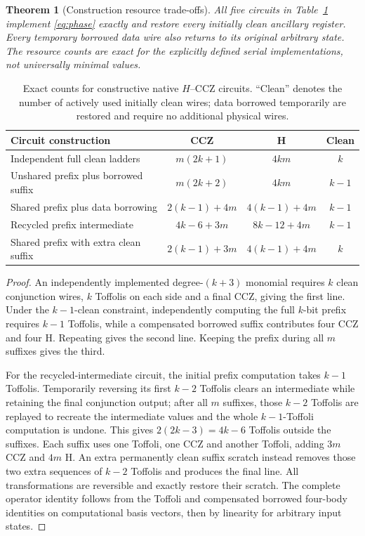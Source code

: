 \documentclass[11pt,a4paper]{article}
\newtheorem{theorem}{Theorem}
\begin{document}
\begin{theorem}[Construction resource trade-offs]\label{thm:bounds}
All five circuits in Table~\ref{tab:formulas} implement \eqref{eq:phase} exactly and restore every initially clean ancillary register. Every temporary borrowed data wire also returns to its original arbitrary state. The resource counts are exact for the explicitly defined serial implementations, not universally minimal values.
\end{theorem}
\begin{table}[ht]
\centering\small
\caption{Exact counts for constructive native $H$--CCZ circuits. ``Clean'' denotes the number of actively used initially clean wires; data borrowed temporarily are restored and require no additional physical wires.}
\label{tab:formulas}
\begin{tabular}{@{}lccc@{}}\toprule
Circuit construction & CCZ & H & Clean\\\midrule
Independent full clean ladders & $m(2k+1)$ & $4km$ & $k$\\
Unshared prefix plus borrowed suffix & $m(2k+2)$ & $4km$ & $k-1$\\
Shared prefix plus data borrowing & $2(k-1)+4m$ & $4(k-1)+4m$ & $k-1$\\
Recycled prefix intermediate & $4k-6+3m$ & $8k-12+4m$ & $k-1$\\
Shared prefix with extra clean suffix & $2(k-1)+3m$ & $4(k-1)+4m$ & $k$\\\bottomrule
\end{tabular}
\end{table}
\begin{proof}
An independently implemented degree-$(k+3)$ monomial requires $k$ clean conjunction wires, $k$ Toffolis on each side and a final CCZ, giving the first line. Under the $k-1$-clean constraint, independently computing the full $k$-bit prefix requires $k-1$ Toffolis, while a compensated borrowed suffix contributes four CCZ and four H. Repeating gives the second line. Keeping the prefix during all $m$ suffixes gives the third.

For the recycled-intermediate circuit, the initial prefix computation takes $k-1$ Toffolis. Temporarily reversing its first $k-2$ Toffolis clears an intermediate while retaining the final conjunction output; after all $m$ suffixes, those $k-2$ Toffolis are replayed to recreate the intermediate values and the whole $k-1$-Toffoli computation is undone. This gives $2(2k-3)=4k-6$ Toffolis outside the suffixes. Each suffix uses one Toffoli, one CCZ and another Toffoli, adding $3m$ CCZ and $4m$ H. An extra permanently clean suffix scratch instead removes those two extra sequences of $k-2$ Toffolis and produces the final line. All transformations are reversible and exactly restore their scratch. The complete operator identity follows from the Toffoli and compensated borrowed four-body identities on computational basis vectors, then by linearity for arbitrary input states.
\end{proof}
\end{document}
